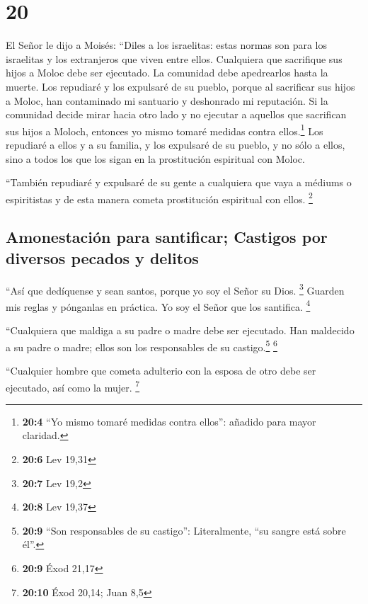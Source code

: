 \hypertarget{section-19}{%
\section{20}\label{section-19}}

 El Señor le dijo a Moisés:  ``Diles a los
israelitas: estas normas son para los israelitas y los extranjeros que
viven entre ellos. Cualquiera que sacrifique sus hijos a Moloc debe ser
ejecutado. La comunidad debe apedrearlos hasta la muerte. 
Los repudiaré y los expulsaré de su pueblo, porque al sacrificar sus
hijos a Moloc, han contaminado mi santuario y deshonrado mi reputación.
 Si la comunidad decide mirar hacia otro lado y no
ejecutar a aquellos que sacrifican sus hijos a Moloch, entonces yo mismo
tomaré medidas contra ellos.\footnote{\textbf{20:4} ``Yo mismo tomaré
  medidas contra ellos'': añadido para mayor claridad.} 
Los repudiaré a ellos y a su familia, y los expulsaré de su pueblo, y no
sólo a ellos, sino a todos los que los sigan en la prostitución
espiritual con Moloc.

 ``También repudiaré y expulsaré de su gente a cualquiera
que vaya a médiums o espiritistas y de esta manera cometa prostitución
espiritual con ellos. \footnote{\textbf{20:6} Lev 19,31}

\hypertarget{amonestaciuxf3n-para-santificar-castigos-por-diversos-pecados-y-delitos}{%
\subsection{Amonestación para santificar; Castigos por diversos pecados
y
delitos}\label{amonestaciuxf3n-para-santificar-castigos-por-diversos-pecados-y-delitos}}

 ``Así que dedíquense y sean santos, porque yo soy el
Señor su Dios. \footnote{\textbf{20:7} Lev 19,2}  Guarden
mis reglas y pónganlas en práctica. Yo soy el Señor que los santifica.
\footnote{\textbf{20:8} Lev 19,37}

 ``Cualquiera que maldiga a su padre o madre debe ser
ejecutado. Han maldecido a su padre o madre; ellos son los responsables
de su castigo.\footnote{\textbf{20:9} ``Son responsables de su
  castigo'': Literalmente, ``su sangre está sobre él''.} \footnote{\textbf{20:9}
  Éxod 21,17}

 ``Cualquier hombre que cometa adulterio con la esposa de
otro debe ser ejecutado, así como la mujer. \footnote{\textbf{20:10}
  Éxod 20,14; Juan 8,5}

